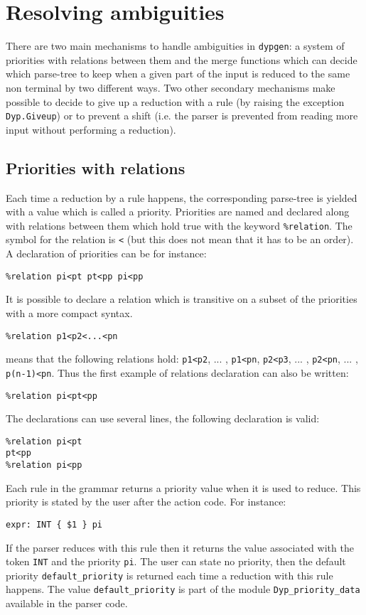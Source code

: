 \documentclass[12pt]{article}
\begin{document}
{\section{Resolving ambiguities}\label{ambiguities}

There are two main mechanisms to handle ambiguities in \texttt{dypgen}: a system of priorities with relations between them and the merge functions which can decide which parse-tree to keep when a given part of the input is reduced to the same non terminal by two different ways. Two other secondary mechanisms make possible to decide to give up a reduction with a rule (by raising the exception \texttt{Dyp.Giveup}) or to prevent a shift (i.e. the parser is prevented from reading more input without performing a reduction).

\subsection{Priorities with relations}\label{priority}

Each time a reduction by a rule happens, the corresponding parse-tree is yielded with a value which is called a priority.
Priorities are named and declared along with relations between them which hold true with the keyword \texttt{\%relation}. The symbol for the relation is \texttt{<} (but this does not mean that it has to be an order). A declaration of priorities can be for instance:
\begin{verbatim}
%relation pi<pt pt<pp pi<pp
\end{verbatim}
It is possible to declare a relation which is transitive on a subset of the priorities with a more compact syntax.
\begin{verbatim}
%relation p1<p2<...<pn
\end{verbatim}
means that the following relations hold: \texttt{p1<p2}, ... , \texttt{p1<pn}, \texttt{p2<p3}, ... , \texttt{p2<pn}, ... , \texttt{p(n-1)<pn}. Thus the first example of relations declaration can also be written:
\begin{verbatim}
%relation pi<pt<pp
\end{verbatim}
The declarations can use several lines, the following declaration is valid:
\begin{verbatim}
%relation pi<pt
pt<pp
%relation pi<pp
\end{verbatim}

Each rule in the grammar returns a priority value when it is used to reduce. This priority is stated by the user after the action code. For instance:
\begin{verbatim}
expr: INT { $1 } pi
\end{verbatim}
If the parser reduces with this rule then it returns the value associated with the token \texttt{INT} and the priority \texttt{pi}. The user can state no priority, then the default priority \texttt{default\_priority} is returned each time a reduction with this rule happens. The value \verb|default_priority| is part of the module \verb|Dyp_priority_data| available in the parser code.\\

}
\end{document}
